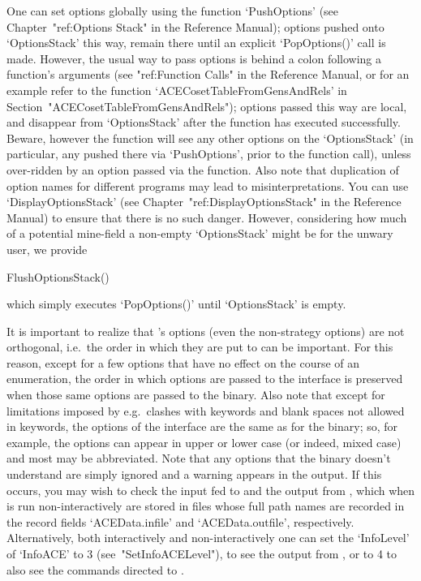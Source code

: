 \beginitems

One can set options globally using  the  function  `PushOptions'  (see
Chapter~"ref:Options Stack" in the {\GAP} Reference  Manual);  options
pushed onto `OptionsStack' this way, remain there  until  an  explicit
`PopOptions()' call is made. However, the usual way to pass options is
behind a colon following a  function's  arguments  (see  "ref:Function
Calls" in the {\GAP} Reference Manual, or for an example refer to  the
function               `ACECosetTableFromGensAndRels'               in
Section~"ACECosetTableFromGensAndRels"); options passed this  way  are
local, and  disappear  from  `OptionsStack'  after  the  function  has
executed successfully. Beware, however the function will see any other
options on the `OptionsStack' (in particular,  any  pushed  there  via
`PushOptions', prior to the function call), unless over-ridden  by  an
option passed via the function. Also note that duplication  of  option
names for different programs may lead to misinterpretations.  You  can
use `DisplayOptionsStack'  (see  Chapter~"ref:DisplayOptionsStack"  in
the {\GAP} Reference Manual) to ensure that there is no  such  danger.
However, considering how much of a potential  mine-field  a  non-empty
`OptionsStack' might be for the unwary user, we provide

\>FlushOptionsStack()

which simply executes `PopOptions()' until `OptionsStack' is empty.

\enditems

It  is  important  to  realize  that  {\ACE}'s   options   (even   the
non-strategy options) are not orthogonal, i.e.\  the  order  in  which
they are put to {\ACE} can be important. For this reason, except for a
few options that have no effect on the course of an  enumeration,  the
order in which options are passed to the {\ACE} interface is preserved
when those same options are passed to the  {\ACE}  binary.  Also  note
that except for limitations  imposed  by  {\GAP}  e.g.\  clashes  with
{\GAP} keywords and blank spaces not allowed in keywords, the  options
of the {\ACE} interface are the  same  as  for  the  binary;  so,  for
example, the options can appear in upper or  lower  case  (or  indeed,
mixed case) and most may be abbreviated. Note that  any  options  that
the {\ACE} binary doesn't understand are simply ignored and a  warning
appears in the {\ACE} output. If this occurs, you may  wish  to  check
the input fed to {\ACE} and the output from {\ACE}, which when  {\ACE}
is run non-interactively are stored in files whose full path names are
recorded in the record fields `ACEData.infile' and  `ACEData.outfile',
respectively. Alternatively, both interactively and  non-interactively
one can set the `InfoLevel' of `InfoACE' to 3 (see~"SetInfoACELevel"),
to see the output from {\ACE}, or  to  4  to  also  see  the  commands
directed to {\ACE}.

